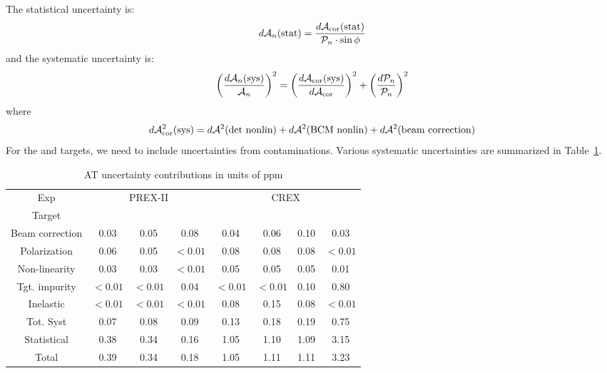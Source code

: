 The statistical uncertainty is:
\begin{equation}
    d\mathcal{A}_n(\text{stat}) = \frac{d\mathcal{A}_{\text{cor}}(\text{stat})}{\mathcal{P}_n \cdot \sin\phi}
\end{equation}
and the systematic uncertainty is:
\begin{equation}
    \left( \frac{d\mathcal{A}_n(\text{sys})}{\mathcal{A}_n} \right)^2 = 
	\left( \frac{d\mathcal{A}_{\text{cor}}(\text{sys})}{d\mathcal{A}_{\text{cor}}} \right)^2
	+ \left( \frac{d\mathcal{P}_n}{\mathcal{P}_n}\right)^2 
\end{equation}
where
\begin{equation}
    d\mathcal{A}^2_{\text{cor}}(\text{sys}) = d\mathcal{A}^2(\text{det\ nonlin}) + d\mathcal{A}^2(\text{BCM\ nonlin}) + d\mathcal{A}^2(\text{beam\ correction})
\end{equation}
For the \Pb and \Ca targets, we need to include uncertainties from contaminations.
Various systematic uncertainties are summarized in Table~\ref{tab:AT_uncertainties}.
\begin{table}[!h]
    \centering
    \begin{tabular}{c c c c | c c c c}
	\hline
	Exp & \multicolumn{3}{c|}{PREX-II}  & \multicolumn{4}{c}{CREX}	\\
	Target	& \Carbon	& \ca	& \Pb	& \Carbon	& \ca	& \Ca	& \Pb	\\
	\hline
	Beam correction & 0.03  & 0.05  & 0.08  & 0.04  & 0.06  & 0.10  & 0.03	\\
	Polarization    & 0.06  & 0.05  & $<0.01$ & 0.08  & 0.08  & 0.08  & $<0.01$	\\
	Non-linearity   & 0.03  & 0.03  & $<0.01$ & 0.05  & 0.05  & 0.05  & 0.01	\\
	Tgt. impurity   & $<0.01$ & $<0.01$ & 0.04  & $<0.01$ & $<0.01$ & 0.10  & 0.80	\\
	Inelastic	& $<0.01$ & $<0.01$ & $<0.01$ & 0.08  & 0.15  & 0.08  & $<0.01$	\\
	\hline	
	Tot. Syst	& 0.07  & 0.08  & 0.09  & 0.13  & 0.18  & 0.19  & 0.75	\\
	Statistical	& 0.38  & 0.34  & 0.16  & 1.05  & 1.10  & 1.09  & 3.15	\\
	Total		& 0.39  & 0.34  & 0.18  & 1.05  & 1.11  & 1.11  & 3.23	\\
	\hline
    \end{tabular}
    \caption{AT uncertainty contributions in units of ppm}
    \label{tab:AT_uncertainties}
\end{table}

